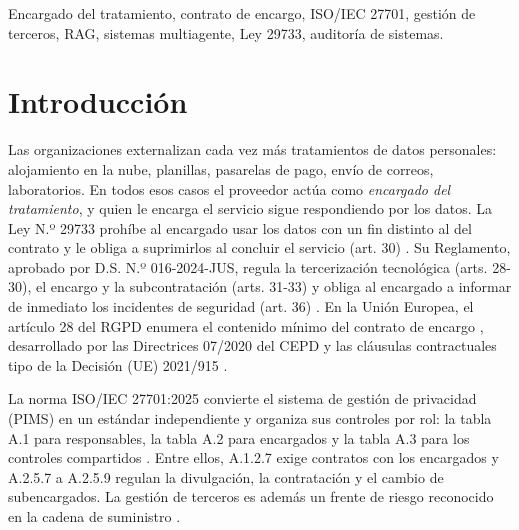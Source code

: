 \documentclass[conference]{IEEEtran}
\begin{document}
\begin{IEEEkeywords}
Encargado del tratamiento, contrato de encargo, ISO/IEC 27701, gestión de terceros, RAG, sistemas multiagente, Ley 29733, auditoría de sistemas.
\end{IEEEkeywords}

\section{Introducción}
Las organizaciones externalizan cada vez más tratamientos de datos personales: alojamiento en la nube, planillas, pasarelas de pago, envío de correos, laboratorios. En todos esos casos el proveedor actúa como \emph{encargado del tratamiento}, y quien le encarga el servicio sigue respondiendo por los datos. La Ley N.º 29733 prohíbe al encargado usar los datos con un fin distinto al del contrato y le obliga a suprimirlos al concluir el servicio (art. 30) \cite{ley29733}. Su Reglamento, aprobado por D.S. N.º 016-2024-JUS, regula la tercerización tecnológica (arts. 28-30), el encargo y la subcontratación (arts. 31-33) y obliga al encargado a informar de inmediato los incidentes de seguridad (art. 36) \cite{ds0162024}. En la Unión Europea, el artículo 28 del RGPD enumera el contenido mínimo del contrato de encargo \cite{rgpd2016}, desarrollado por las Directrices 07/2020 del CEPD \cite{edpb2021} y las cláusulas contractuales tipo de la Decisión (UE) 2021/915 \cite{dec2021915}.

La norma ISO/IEC 27701:2025 convierte el sistema de gestión de privacidad (PIMS) en un estándar independiente y organiza sus controles por rol: la tabla A.1 para responsables, la tabla A.2 para encargados y la tabla A.3 para los controles compartidos \cite{iso27701_2025}. Entre ellos, A.1.2.7 exige contratos con los encargados y A.2.5.7 a A.2.5.9 regulan la divulgación, la contratación y el cambio de subencargados. La gestión de terceros es además un frente de riesgo reconocido en la cadena de suministro \cite{nist800161}.
\end{document}
